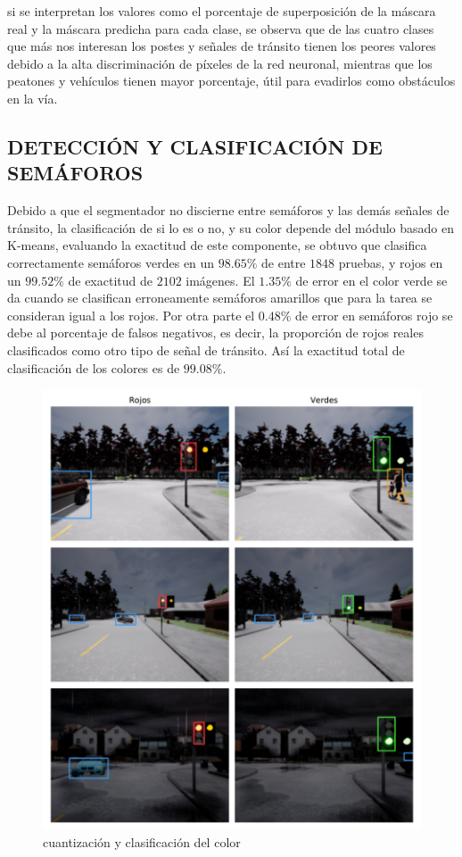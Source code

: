 	si se interpretan los valores como el porcentaje de superposición de la máscara real y la máscara predicha para cada clase, se observa que de las cuatro clases que más nos interesan los postes y señales de tránsito tienen los peores valores debido a la alta discriminación de píxeles de la red neuronal, mientras que los peatones y vehículos tienen mayor porcentaje, útil para evadirlos como obstáculos en la vía.
	
\subsection{DETECCIÓN Y CLASIFICACIÓN DE SEMÁFOROS}
	Debido a que el segmentador no discierne entre semáforos y las demás señales de tránsito, la clasificación de si lo es o no, y su color depende del módulo basado en K-means, evaluando la exactitud de este componente, se obtuvo que clasifica correctamente semáforos verdes en un $98.65\%$ de entre $1848$ pruebas, y rojos en un $99.52\%$ de exactitud de $2102$ imágenes. El $1.35\%$ de error en el color verde se da cuando se clasifican erroneamente semáforos amarillos que para la tarea se consideran igual a los rojos. Por otra parte el $0.48\%$ de error en semáforos rojo se debe al porcentaje de falsos negativos, es decir, la proporción de rojos reales clasificados como otro tipo de señal de tránsito. Así la exactitud total de clasificación de los colores es de $99.08\%$.
	
	\begin{figure}[H]
		\centering
		\includegraphics[scale=0.65]{imagenes/preds/semaforos}
		\caption[Cuantización y Clasificación del Color]{cuantización y clasificación del color}
		\label{semaforos}
	\end{figure}
	
